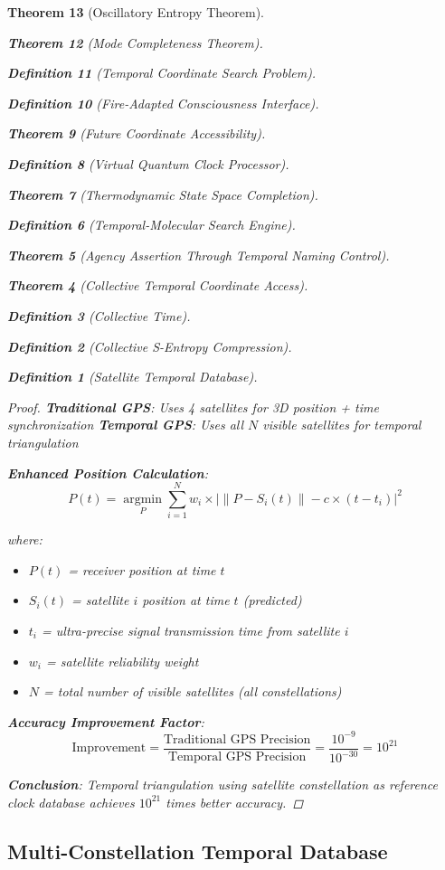 \documentclass[12pt,a4paper]{article}
\newtheorem{theorem}{Theorem}[section]
\newtheorem{definition}[theorem]{Definition}
\begin{document}
\begin{theorem}[Oscillatory Entropy Theorem]
\begin{theorem}[Mode Completeness Theorem]
\begin{enumerate}
\begin{definition}[Temporal Coordinate Search Problem]
\begin{algorithm}
\begin{definition}[Fire-Adapted Consciousness Interface]
\begin{theorem}[Future Coordinate Accessibility]
\begin{definition}[Virtual Quantum Clock Processor]
\begin{itemize}
\begin{itemize}
\begin{theorem}[Thermodynamic State Space Completion]
\begin{definition}[Temporal-Molecular Search Engine]
\begin{theorem}[Agency Assertion Through Temporal Naming Control]
\begin{remark}
\begin{theorem}[Collective Temporal Coordinate Access]
\begin{definition}[Collective Time]
\begin{definition}[Collective S-Entropy Compression]
\begin{definition}[Satellite Temporal Database]
\begin{proof}
\textbf{Traditional GPS}: Uses 4 satellites for 3D position + time synchronization
\textbf{Temporal GPS}: Uses all $N$ visible satellites for temporal triangulation

\textbf{Enhanced Position Calculation}:
$$P(t) = \underset{P}{\operatorname{argmin}} \sum_{i=1}^{N} w_i \times \left|\|P - S_i(t)\| - c \times (t - t_i)\right|^2$$

where:
\begin{itemize}
\item $P(t)$ = receiver position at time $t$
\item $S_i(t)$ = satellite $i$ position at time $t$ (predicted)
\item $t_i$ = ultra-precise signal transmission time from satellite $i$
\item $w_i$ = satellite reliability weight
\item $N$ = total number of visible satellites (all constellations)
\end{itemize}

\textbf{Accuracy Improvement Factor}:
$$\text{Improvement} = \frac{\text{Traditional GPS Precision}}{\text{Temporal GPS Precision}} = \frac{10^{-9}}{10^{-30}} = 10^{21}$$

\textbf{Conclusion}: Temporal triangulation using satellite constellation as reference clock database achieves $10^{21}$ times better accuracy.
\end{proof}

\subsection{Multi-Constellation Temporal Database}


\end{definition}
\end{definition}
\end{definition}
\end{theorem}
\end{remark}
\end{theorem}
\end{definition}
\end{theorem}
\end{itemize}
\end{itemize}
\end{definition}
\end{theorem}
\end{definition}
\end{algorithm}
\end{definition}
\end{enumerate}
\end{theorem}
\end{theorem}
\end{document}
